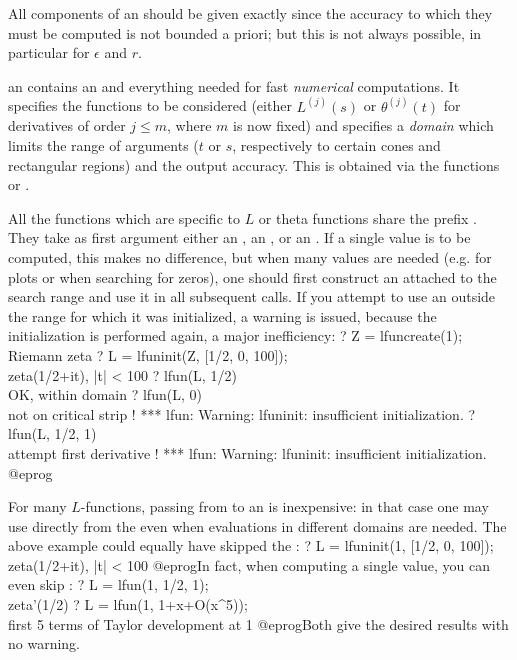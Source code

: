  All components of an  should be given
exactly since the accuracy to which they must be computed is not bounded a
priori; but this is not always possible, in particular for $\epsilon$ and $r$.

\item an  contains an  and everything needed for fast
\emph{numerical} computations. It specifies the functions to be considered
(either $L^{(j)}(s)$ or $\theta^{(j)}(t)$ for derivatives of order $j \leq
m$, where $m$ is now fixed) and specifies a \emph{domain} which limits
the range of arguments ($t$ or $s$, respectively to certain cones and
rectangular regions) and the output accuracy. This is obtained via the
functions  or .

All the functions which are specific to $L$ or theta functions share the
prefix . They take as first argument either an , an
, or an . If a single value is to be computed,
this makes no difference, but when many values are needed (e.g. for plots or
when searching for zeros), one should first construct an 
attached to the search range and use it in all subsequent calls.
If you attempt to use an  outside the range for which it was
initialized, a warning is issued, because the initialization is
performed again, a major inefficiency:
\bprog
? Z = lfuncreate(1); \\ Riemann zeta
? L = lfuninit(Z, [1/2, 0, 100]); \\ zeta(1/2+it), |t| < 100
? lfun(L, 1/2)    \\ OK, within domain
? lfun(L, 0)      \\ not on critical strip !
  *** lfun: Warning: lfuninit: insufficient initialization.
? lfun(L, 1/2, 1) \\ attempt first derivative !
*** lfun: Warning: lfuninit: insufficient initialization.
@eprog

For many $L$-functions, passing from  to an  is
inexpensive: in that case one may use  directly from the
 even when evaluations in different domains are needed. The
above example could equally have skipped the :
\bprog
? L = lfuninit(1, [1/2, 0, 100]); \\ zeta(1/2+it), |t| < 100
@eprog\noindent In fact, when computing a single value, you can even skip
:
\bprog
? L = lfun(1, 1/2, 1); \\ zeta'(1/2)
? L = lfun(1, 1+x+O(x^5)); \\ first 5 terms of Taylor development at 1
@eprog\noindent Both give the desired results with no warning.

